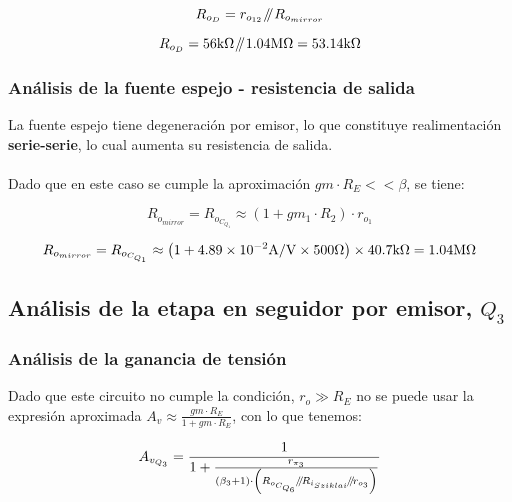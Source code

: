 \begin{equation}
R_{o_{D}} = r_{o_{12}} \parallelresistors R_{o_{mirror}}
\end{equation}


\begin{equation*}
R_{o_{D}} = 56 \si[per-mode=symbol]{\kilo\ohm} \parallelresistors 1.04 \si[per-mode=symbol]{\mega\ohm} = 53.14 \si[per-mode=symbol]{\kilo\ohm}
\end{equation*}


\subsubsection{Análisis de la fuente espejo - resistencia de salida}

La fuente espejo tiene degeneración por emisor, lo que constituye realimentación \textbf{serie-serie}, lo cual aumenta su resistencia de salida.\\ \\
Dado que en este caso se cumple la aproximación $gm \cdot R_{E} << \beta$, se tiene:

\begin{equation}
R_{o_{mirror}} = R_{o_{C_{Q_{1}}}} \approx \left( 1 + gm_{1} \cdot R_{2} \right) \cdot r_{o_{1}}
\end{equation} 

\begin{equation*}
R_{o_{mirror}} = R_{o_{C_{Q_{1}}}} \approx \left( 1 + \num{4.89E-2} \si[per-mode=symbol]{\ampere\per\volt}  \times 500 \si[per-mode=symbol]{\ohm}  \right) \times 40.7 \si[per-mode=symbol]{\kilo\ohm} = 1.04 \si[per-mode=symbol]{\mega\ohm}
\end{equation*} 

\subsection{Análisis de la etapa en seguidor por emisor, $Q_{3}$}


\subsubsection{Análisis de la ganancia de tensión}

Dado que este circuito no cumple la condición, $r_{o} \gg R_{E}$ no se puede usar la expresión aproximada $A_{v} \approx \frac{gm \cdot R_{E}}{1 + gm \cdot R_{E}}$, con lo que tenemos:

\begin{equation}
A_{v_{Q_{3}}} = \frac{1}{1 + \frac{r_{\pi_{3}}}{  \left(  \beta_{3} + 1 \right) \cdot \left(  R_{o_{C_{Q_{6}}}} \parallelresistors R_{i_{Sziklai}} \parallelresistors r_{o_{3}}  \right)  } }
\end{equation}

